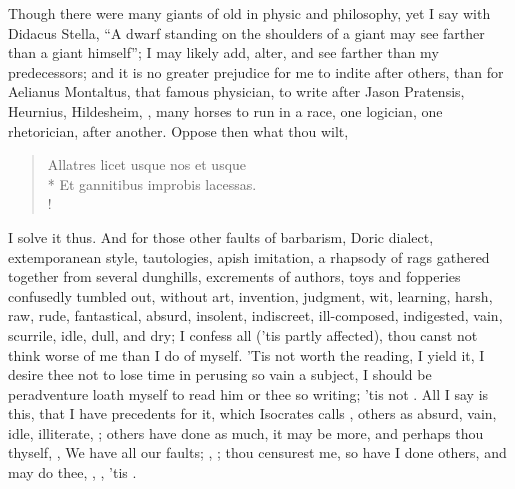 
Though there were many giants of old in physic and philosophy, yet I say with
Didacus Stella, \enquote{A dwarf standing on the shoulders of a
giant may see farther than a giant himself}; I may likely add, alter, and see
farther than my predecessors; and it is no greater prejudice for me to indite
after others, than for Aelianus Montaltus, that famous physician, to write
 after Jason Pratensis, Heurnius,
Hildesheim, \etc{}, many horses to run in a race, one logician, one
rhetorician, after another. Oppose then what thou wilt,

\begin{latin}
\begin{verse}%
Allatres licet usque nos et usque\\*
Et gannitibus improbis lacessas.\\!
\end{verse}%
\end{latin}

I solve it thus. And for those other faults of barbarism,
Doric dialect, extemporanean style, tautologies, apish
imitation, a rhapsody of rags gathered together from several dunghills,
excrements of authors, toys and fopperies confusedly tumbled out, without art,
invention, judgment, wit, learning, harsh, raw, rude, fantastical, absurd,
insolent, indiscreet, ill-composed, indigested, vain, scurrile, idle, dull, and
dry; I confess all ('tis partly affected), thou canst not think worse of me
than I do of myself. 'Tis not worth the reading, I yield it, I desire thee not
to lose time in perusing so vain a subject, I should be peradventure loath
myself to read him or thee so writing; 'tis not . All I say
is this, that I have precedents for it, which Isocrates
calls , others as absurd, vain, idle, illiterate,
\etc{} ; others have done as much, it may be
more, and perhaps thou thyself, , \etc{} We have all our
faults; , \etc{}; thou
censurest me, so have I done others, and may do thee, ,
\etc{}, 'tis .

